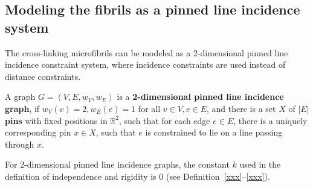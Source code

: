 \subsection{Modeling the fibrils as a pinned line incidence system}



The cross-linking  microfibrils can be modeled as a 2-dimensional pinned line incidence constraint system,
where incidence constraints are used instead of distance constraints.


\begin{definition} %
A  graph $G=(V,E, w_V, w_E)$ is a \textbf{2-dimensional pinned line incidence graph},
if  $w_V(v) = 2, w_E(e) = 1$ for all $v \in V, e \in E$, and
there is  a  set $X$ of $|E|$ \textbf{pins} with fixed positions in $\mathbb{R}^2$,
such that  %
for each edge $e \in E$, there is a uniquely corresponding pin $x \in X$,
such that $e$ is constrained to lie on a line passing through $x$.

\end{definition}

\begin{remark}
For 2-dimensional pinned line incidence graphs,
the constant $k$ used in the definition of independence and rigidity is $0$  \cite{xxx} (see Definition~\ref{xxx}--\ref{xxx}).
\end{remark}



